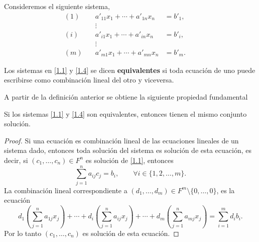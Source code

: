 \documentclass[12pt,a4paper]{book}
\newcommand{\llaves}[1]{\{#1\}}
\newcommand{\parentesis}[1]{\left(#1\right)}
\begin{document}
    Consideremos el siguiente sistema,
    \begin{equation}
        \begin{alignedat}{3}
            (1)\quad & a'_{11}x_1 + \cdots + a'_{1n}x_n & =  b'_1,\\
            &\vdots   &                                  &   &      \\
            (i)\quad & a'_{i1}x_1 +  \cdots + a'_{in}x_n & =  b'_i,\\
            &\vdots   &                                  &   &      \\
            (m)\quad & a'_{m1}x_1 + \cdots + a'_{mn}x_n & =  b'_m.
        \end{alignedat}
        \tag{1.4}
        \label{1.4}
    \end{equation}

    \begin{definicion}
        Los sistemas en \eqref{1.1} y \eqref{1.4} se dicen \textbf{equivalentes} si toda ecuación de uno puede escribirse como combinación lineal del otro y viceversa.
    \end{definicion}
    
    A partir de la definición anterior se obtiene la siguiente propiedad fundamental
    
    \begin{proposicion}
        Si los sistemas \eqref{1.1} y \eqref{1.4} son equivalentes, entonces tienen el mismo conjunto solución.
    \end{proposicion}
    
    \begin{proof}
        Si una ecuación es combinación lineal de las ecuaciones lineales de un sistema dado, entonces toda solución del sistema es solución de esta ecuación, es decir, si $\parentesis{c_1, \dots , c_n} \in F^n$ es solución de \eqref{1.1}, entonces 
        \begin{equation*}
            \sum_{j = 1}^{n}a_{ij}c_j = b_i, \qquad \forall i \in \llaves{1, 2, \dots, m}.
        \end{equation*}
        La combinación lineal correspondiente a $(d_1, \dots , d_m) \in F^m \setminus \llaves{0, \dots , 0}$, es la ecuación
        \begin{equation*}
            d_1 \parentesis{\sum_{j = 1}^na_{1j}x_j} + \dotsi + d_i \parentesis{\sum_{j = 1}^na_{ij}x_j} + \dotsi + d_m \parentesis{\sum_{j = 1}^na_{mj}x_j} = \sum_{i = 1}^m d_ib_i.
        \end{equation*}
        Por lo tanto $\parentesis{c_1, \dots, c_n}$ es solución de esta ecuación.
    \end{proof}
    
\end{document}

